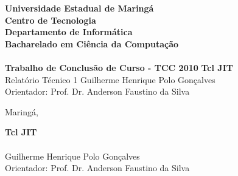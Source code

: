 \documentclass[12pt]{article}
\newcommand{\instituicao}{Universidade Estadual de Maringá \\
Centro de Tecnologia \\
Departamento de Informática \\
Bacharelado em Ciência da Computação \\
\hfill}
\newcommand{\tcc}{Trabalho de Conclusão de Curso - TCC 2010}
\newcommand{\titulo}{Tcl JIT}
\newcommand{\autor}{Guilherme Henrique Polo Gonçalves}
\newcommand{\orientador}{Prof. Dr. Anderson Faustino da Silva}
\newcommand{\local}{Maringá}
\newcommand*{\textbfsf}[1]{\textbf{\textsf{#1}}}
\begin{document}
\begin{titlepage}
  \begin{center}
    {\Large \textbfsf \instituicao}\\
    {\large \textbfsf \tcc}
    \vfill
    {\large \textbfsf \titulo\\\vfill Relatório Técnico 1}
    \vfill
    \autor\\
    Orientador: \orientador\\ %
  \end{center}

  \vfill

  \vfill
  \begin{center}
    \local, \@date
  \end{center}

\end{titlepage}

\clearpage
\thispagestyle{empty}
\begin{center}
  {\large \textbfsf \titulo}\\
  \quad\\
  \autor\\
  Orientador: \orientador\\ %
  \quad\\
\end{center}

\newpage

\setcounter{page}{1}

\end{document}
